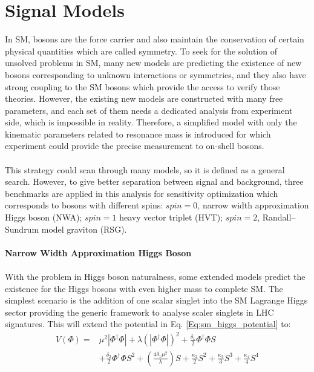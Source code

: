 \section{Signal Models}
\label{sec:signal_intro}
In SM, bosons are the force carrier and also maintain the conservation of certain physical quantities which are called symmetry. To seek for the solution of unsolved problems in SM, many new models are predicting the existence of new bosons corresponding to unknown interactions or symmetries, and they also have strong coupling to the SM bosons which provide the access to verify those theories. However, the existing new models are constructed with many free parameters, and each set of them needs a dedicated analysis from experiment side, which is impossible in reality. Therefore, a simplified model with only the kinematic parameters related to resonance mass is introduced for which experiment could provide the precise measurement to on-shell bosons.  
\\
\\This strategy could scan through many models, so it is defined as a general search. However, to give better separation between signal and background, three benchmarks are applied in this analysis for sensitivity optimization which corresponds to bosons with different spins: $spin=0$, narrow width approximation Higgs boson (NWA); $spin=1$ heavy vector triplet (HVT); $spin=2$, Randall–Sundrum model graviton (RSG).
\\
\\{\bf Narrow Width Approximation Higgs Boson}
\\
\\With the problem in Higgs boson naturalness, some extended models predict the existence for the Higgs bosons with even higher mass to complete SM. The simplest scenario is the addition of one scalar singlet into the SM Lagrange Higgs sector providing the generic framework to analyse scaler singlets in LHC signatures. This will extend the potential in Eq. \ref{Eq:sm_higgs_potential} to:
\begin{equation}
 \begin{aligned}
    V(\Phi)={} & \mu^2|\Phi^\dagger\Phi|+\lambda(|\Phi^\dagger\Phi|)^2+\frac{\delta_1}{2}\Phi^{\dagger}\Phi S \\
   & +\frac{\delta_2}{2}\Phi^{\dagger}\Phi S^2+(\frac{4\delta_{1}\mu^2}{\lambda})S+\frac{\kappa_2}{2}S^{2}+\frac{\kappa_3}{3}S^{3}+\frac{\kappa_4}{4}S^{4}
 \end{aligned}
\end{equation}

